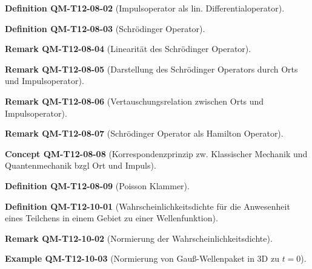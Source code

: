 \documentclass[10pt, letterpaper]{article}
\newcommand{\CustomHeading}[3]{%
  \par\medskip\noindent%
  \textbf{#1 #2} \textnormal{(#3)}.\enskip%
}
\newenvironment{DEF}[2]{\CustomHeading{Definition}{#1}{#2}}{}
\newenvironment{REM}[2]{\CustomHeading{Remark}{#1}{#2}}{}
\newenvironment{EXA}[2]{\CustomHeading{Example}{#1}{#2}}{}
\newenvironment{CONC}[2]{\CustomHeading{Concept}{#1}{#2}}{}
\begin{document}
\begin{DEF}{QM-T12-08-02}{Impulsoperator als lin. Differentialoperator}
\end{DEF}

\begin{DEF}{QM-T12-08-03}{Schrödinger Operator}
\end{DEF}

\begin{REM}{QM-T12-08-04}{Linearität des Schrödinger Operator}
\end{REM}

\begin{REM}{QM-T12-08-05}{Darstellung des Schrödinger Operators durch Orts und Impulsoperator}
\end{REM}

\begin{REM}{QM-T12-08-06}{Vertauschungsrelation zwischen Orts und Impulsoperator}
\end{REM}

\begin{REM}{QM-T12-08-07}{Schrödinger Operator als Hamilton Operator}
\end{REM}

\begin{CONC}{QM-T12-08-08}{Korrespondenzprinzip zw. Klassischer Mechanik und Quantenmechanik bzgl Ort und Impuls}
\end{CONC}

\begin{DEF}{QM-T12-08-09}{Poisson Klammer}
\end{DEF}

\begin{DEF}{QM-T12-10-01}{Wahrscheinlichkeitsdichte für die Anwesenheit eines Teilchens in einem Gebiet zu einer Wellenfunktion}
\end{DEF}

\begin{REM}{QM-T12-10-02}{Normierung der Wahrscheinlichkeitsdichte}
\end{REM}

\begin{EXA}{QM-T12-10-03}{Normierung von Gauß-Wellenpaket in 3D zu $t=0$}
\end{EXA}
\end{document}
